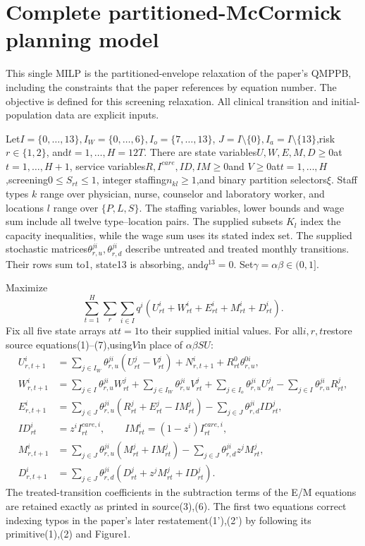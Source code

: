 \documentclass{article}
\begin{document}
\section*{Complete partitioned-McCormick planning model}
This single MILP is the partitioned-envelope relaxation of the paper's QMPPB,
including the constraints that the paper references by equation number.
The objective is defined for this screening relaxation. All clinical transition and initial-population data
are explicit inputs.

Let$I=\{0,\ldots,13\}, I_W=\{0,\ldots,6\},I_o=\{7,\ldots,13\}$,
$J=I\setminus\{0\},I_a=I\setminus\{13\}$,risk$r\in\{1,2\}$,
and$t=1,\ldots,H=12T$. There are state variables$U,W,E,M,D\ge0$at
$t=1,\ldots,H+1$, service variables$R,I^{care},ID,IM\ge0$and
$V\ge0$at$t=1,\ldots,H$,screening$0\le S_{rt}\le1$,
integer staffing$n_{kl}\ge1$,and binary partition selectors$\xi$.
Staff types $k$ range over physician, nurse, counselor and laboratory worker,
and locations $l$ range over $\{P,L,S\}$. The staffing variables, lower bounds
and wage sum include all twelve type--location pairs. The supplied subsets
$K_l$ index the capacity inequalities, while the wage sum uses its stated index set.
The supplied stochastic matrices$\theta^{ji}_{r,u},\theta^{ji}_{r,d}$
describe untreated and treated monthly transitions. Their rows sum to1,
state13 is absorbing, and$q^{13}=0$. Set$\gamma=\alpha\beta\in(0,1]$.

Maximize
\[
\sum_{t=1}^H\sum_r\sum_{i\in I}q^i
(U^i_{rt}+W^i_{rt}+E^i_{rt}+M^i_{rt}+D^i_{rt}).
\]
Fix all five state arrays at$t=1$to their supplied initial values.
For all$i,r,t$restore source equations(1)--(7),using$V$in place of
$\alpha\beta SU$:
\begin{align*}
U^i_{r,t+1}
 &=\sum_{j\in I_W}\theta^{ji}_{r,u}(U^j_{rt}-V^j_{rt})
      +N^i_{r,t+1}+R^0_{rt}\theta^{0i}_{r,u},\\
W^i_{r,t+1}
 &=\sum_{j\in I}\theta^{ji}_{r,u}W^j_{rt}
    +\sum_{j\in I_W}\theta^{ji}_{r,u}V^j_{rt}
    +\sum_{j\in I_o}\theta^{ji}_{r,u}U^j_{rt}
    -\sum_{j\in I}\theta^{ji}_{r,u}R^j_{rt},\\
E^i_{r,t+1}
 &=\sum_{j\in J}\theta^{ji}_{r,u}(R^j_{rt}+E^j_{rt}-IM^j_{rt})
    -\sum_{j\in J}\theta^{ji}_{r,d}ID^j_{rt},\\
ID^i_{rt}&=z^i I^{care,i}_{rt},\qquad
IM^i_{rt}=(1-z^i)I^{care,i}_{rt},\\
M^i_{r,t+1}
 &=\sum_{j\in J}\theta^{ji}_{r,u}(M^j_{rt}+IM^j_{rt})
    -\sum_{j\in J}\theta^{ji}_{r,d}z^jM^j_{rt},\\
D^i_{r,t+1}
 &=\sum_{j\in J}\theta^{ji}_{r,d}(D^j_{rt}+z^jM^j_{rt}+ID^j_{rt}).
\end{align*}
The treated-transition coefficients in the subtraction terms of the E/M
equations are retained exactly as printed in source(3),(6).
The first two equations correct indexing typos in the paper's later
restatement(1'),(2') by following its primitive(1),(2) and Figure1.
\end{document}
